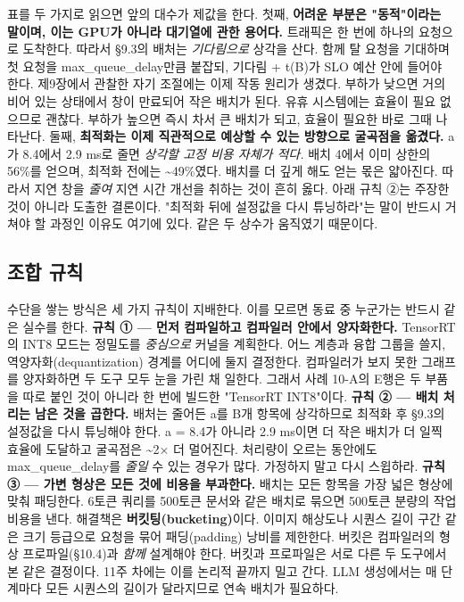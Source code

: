 표를 두 가지로 읽으면 앞의 대수가 제값을 한다. 첫째, \textbf{어려운 부분은 "동적"이라는 말이며, 이는 GPU가 아니라 대기열에 관한 용어다.} 트래픽은 한 번에 하나의 요청으로 도착한다. 따라서 §9.3의 배처는 \textit{기다림으로} 상각을 산다. 함께 탈 요청을 기대하며 첫 요청을 max\_queue\_delay만큼 붙잡되, 기다림 + t(B)가 SLO 예산 안에 들어야 한다. 제9장에서 관찰한 자기 조절에는 이제 작동 원리가 생겼다. 부하가 낮으면 거의 비어 있는 상태에서 창이 만료되어 작은 배치가 된다. 유휴 시스템에는 효율이 필요 없으므로 괜찮다. 부하가 높으면 즉시 차서 큰 배치가 되고, 효율이 필요한 바로 그때 나타난다. 둘째, \textbf{최적화는 이제 직관적으로 예상할 수 있는 방향으로 굴곡점을 옮겼다.} a가 8.4에서 2.9 ms로 줄면 \textit{상각할 고정 비용 자체가 적다.} 배치 4에서 이미 상한의 56\%를 얻으며, 최적화 전에는 \textasciitilde{}49\%였다. 배치를 더 깊게 해도 얻는 몫은 얇아진다. 따라서 지연 창을 \textit{줄여} 지연 시간 개선을 취하는 것이 흔히 옳다. 아래 규칙 ②는 주장한 것이 아니라 도출한 결론이다. "최적화 뒤에 설정값을 다시 튜닝하라"는 말이 반드시 거쳐야 할 과정인 이유도 여기에 있다. 같은 두 상수가 움직였기 때문이다.

\subsection*{조합 규칙}

수단을 쌓는 방식은 세 가지 규칙이 지배한다. 이를 모르면 동료 중 누군가는 반드시 같은 실수를 한다. \textbf{규칙 ① — 먼저 컴파일하고 컴파일러 안에서 양자화한다.} TensorRT의 INT8 모드는 정밀도를 \textit{중심으로} 커널을 계획한다. 어느 계층과 융합 그룹을 쓸지, 역양자화(dequantization) 경계를 어디에 둘지 결정한다. 컴파일러가 보지 못한 그래프를 양자화하면 두 도구 모두 눈을 가린 채 일한다. 그래서 사례 10-A의 E행은 두 부품을 따로 붙인 것이 아니라 한 번에 빌드한 "TensorRT INT8"이다. \textbf{규칙 ② — 배치 처리는 남은 것을 곱한다.} 배처는 줄어든 a를 B개 항목에 상각하므로 최적화 후 §9.3의 설정값을 다시 튜닝해야 한다. a = 8.4가 아니라 2.9 ms이면 더 작은 배치가 더 일찍 효율에 도달하고 굴곡점은 \textasciitilde{}2× 더 멀어진다. 처리량이 오르는 동안에도 max\_queue\_delay를 \textit{줄일} 수 있는 경우가 많다. 가정하지 말고 다시 스윕하라. \textbf{규칙 ③ — 가변 형상은 모든 것에 비용을 부과한다.} 배치는 모든 항목을 가장 넓은 형상에 맞춰 패딩한다. 6토큰 쿼리를 500토큰 문서와 같은 배치로 묶으면 500토큰 분량의 작업 비용을 낸다. 해결책은 \textbf{버킷팅(bucketing)}이다. 이미지 해상도나 시퀀스 길이 구간 같은 크기 등급으로 요청을 묶어 패딩(padding) 낭비를 제한한다. 버킷은 컴파일러의 형상 프로파일(§10.4)과 \textit{함께} 설계해야 한다. 버킷과 프로파일은 서로 다른 두 도구에서 본 같은 결정이다. 11주 차에는 이를 논리적 끝까지 밀고 간다. LLM 생성에서는 매 단계마다 모든 시퀀스의 길이가 달라지므로 연속 배치가 필요하다.

